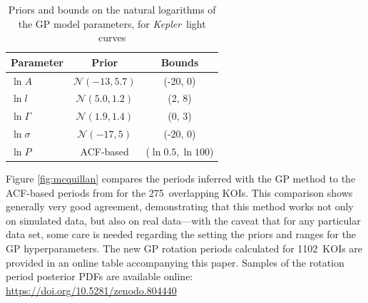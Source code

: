 \documentclass[a4paper,fleqn,usenatbib,useAMS]{mnras}
\newcommand{\response}[1]{{#1}}
\newcommand{\Kepler}{{\it Kepler}}
\newcommand{\nkoi}{1102}
\newcommand{\nkoimcq}{275}
\begin{document}
\begin{table}
\begin{center}
\caption{\label{tab:koipriors} Priors and bounds on the natural logarithms of
    the GP model parameters, for \Kepler\ light curves}
\begin{tabular}{lcc}
Parameter & Prior & Bounds\\
    \hline
    $\ln A$ & $\mathcal N(-13, 5.7)$ & (-20, 0) \\
    $\ln l$ & $\mathcal N(5.0, 1.2)$ & (2, 8) \\
    $\ln \Gamma$ & $\mathcal N(1.9, 1.4)$ & (0, 3) \\
    $\ln \sigma$ & $\mathcal N(-17, 5)$ & (-20, 0) \\
    $\ln P $ & ACF-based & ($\ln 0.5, \ln 100$) \\
\end{tabular}
\end{center}
\end{table}

Figure \ref{fig:mcquillan} compares the periods inferred with the GP method to
the ACF-based periods from \citet{Mcquillan2013} for the \nkoimcq\ overlapping
KOIs.
This comparison shows generally very good agreement, demonstrating that this
method works not only on simulated data, but also on real data---with the
caveat that for any particular data set, some care is needed regarding the
setting the priors and ranges for the GP hyperparameters.
\response{The new GP rotation periods calculated for \nkoi\ KOIs are provided in an
online table accompanying this paper.
Samples of the rotation period posterior PDFs are available online:
\url{https://doi.org/10.5281/zenodo.804440}}
\end{document}
